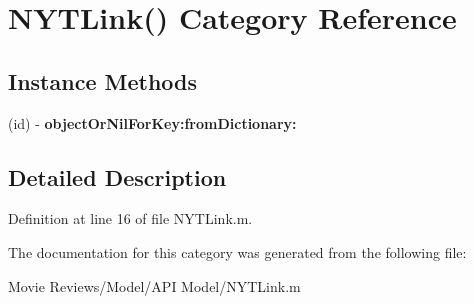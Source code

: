 \section{N\+Y\+T\+Link() Category Reference}
\label{category_n_y_t_link_07_08}
\subsection*{Instance Methods}
\begin{DoxyCompactItemize}
\item 
(id) -\/ {\bfseries object\+Or\+Nil\+For\+Key\+:from\+Dictionary\+:}\label{category_n_y_t_link_07_08_ad9304b3488a57a8abbeb5b2a5dddf832}

\end{DoxyCompactItemize}


\subsection{Detailed Description}


Definition at line 16 of file N\+Y\+T\+Link.\+m.



The documentation for this category was generated from the following file\+:\begin{DoxyCompactItemize}
\item 
Movie Reviews/\+Model/\+A\+P\+I Model/N\+Y\+T\+Link.\+m\end{DoxyCompactItemize}
